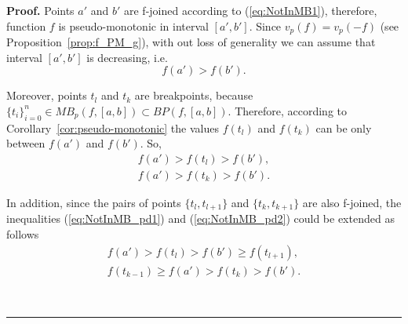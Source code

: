 \documentclass[12pt, a4paper]{article}
\newenvironment{proof}[1][Proof]{\noindent \textbf{#1.} }{\  \rule{0.5em}{0.5em}}
\numberwithin{equation}{section}
\begin{document}
\begin{proof}
  Points $a'$ and $b'$ are f-joined according to (\ref{eq:NotInMB1}), therefore,
  function $f$ is pseudo-monotonic in interval $[a',b']$. 
  Since $v_p(f)=v_p(-f)$ (see Proposition~\ref{prop:f_PM_g}), with out loss of generality 
  we can assume that interval $[a',b']$ is decreasing, i.e. 
  $$f(a') > f(b').$$  
  
  Moreover, points $t_l$ and $t_k$ are breakpoints, 
  because $\{t_i\}_{i=0}^n \in MB_{p}(f,[a,b]) \subset BP(f,[a,b])$.
  Therefore, according to Corollary~\ref{cor:pseudo-monotonic} 
  the values $f(t_{l})$ and $f(t_{k})$ can be only between $f(a')$ and $f(b')$. So,
  \begin{eqnarray}
    f(a') > f(t_{l}) > f(b'), \label{eq:NotInMB_pd1}  \\
    f(a') > f(t_{k}) > f(b'). \label{eq:NotInMB_pd2}
  \end{eqnarray}
  
  In addition, since the pairs of points $\{t_l,t_{l+1}\}$ and $\{t_k,t_{k+1}\}$ are also f-joined, 
  the inequalities (\ref{eq:NotInMB_pd1}) and (\ref{eq:NotInMB_pd2})
  could be extended as follows 
  \begin{eqnarray} 
      f(a') > f(t_{l}) > f(b') \geq f(t_{l+1}), \label{eq:NotInMB_p6.1}    \\
      f(t_{k-1}) \geq f(a') > f(t_{k}) > f(b'). \label{eq:NotInMB_p6.2} 
  \end{eqnarray}  
  

\end{proof}
\end{document}

